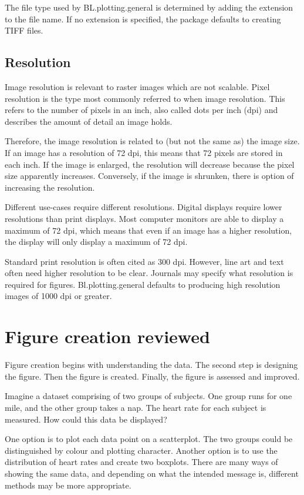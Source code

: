 \documentclass[letterpaper]{article}
\begin{document}
The file type used by BL.plotting.general is determined by adding the extension to the file name. If no extension is specified, the package defaults to creating TIFF files.

\subsection{Resolution}
Image resolution is relevant to raster images which are not scalable. Pixel resolution is the type most commonly referred to when image resolution. This refers to the number of pixels in an inch, also called dots per inch (dpi) and describes the amount of detail an image holds.

Therefore, the image resolution is related to (but not the same as) the image size. If an image has a resolution of 72 dpi, this means that 72 pixels are stored in each inch. If the image is enlarged, the resolution will decrease because the pixel size apparently increases. Conversely, if the image is shrunken, there is option of increasing the resolution.

Different use-cases require different resolutions. Digital displays require lower resolutions than print displays. Most computer monitors are able to display a maximum of 72 dpi, which means that even if an image has a higher resolution, the display will only display a maximum of 72 dpi. 

Standard print resolution is often cited as 300 dpi. However, line art and text often need higher resolution to be clear. Journals may specify what resolution is required for figures. Bl.plotting.general defaults to producing high resolution images of 1000 dpi or greater.

\section{Figure creation reviewed}
Figure creation begins with understanding the data. The second step is designing the figure. Then the figure is created. Finally, the figure is assessed and improved.

Imagine a dataset comprising of two groups of subjects. One group runs for one mile, and the other group takes a nap. The heart rate for each subject is measured. How could this data be displayed? 

One option is to plot each data point on a scatterplot. The two groups could be distinguished by colour and plotting character. Another option is to use the distribution of heart rates and create two boxplots. There are many ways of showing the same data, and depending on what the intended message is, different methods may be more appropriate.
\end{document}
